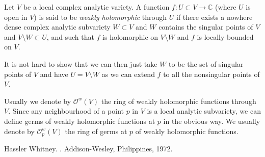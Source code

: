 \documentclass[12pt]{article}
\theoremstyle{theorem}
\theoremstyle{definition}
\theoremstyle{remark}
\begin{document}
Let $V$ be a local complex analytic variety.
A function $f \colon U \subset V \to \mathbb{C}$ (where $U$ is open in $V$)
is said to be {\em weakly holomorphic} through $U$
if there exists a nowhere dense complex analytic subvariety $W \subset V$
and $W$ contains the singular points of $V$ and $V \setminus W \subset U$,
and such that $f$ is holomorphic on $V \setminus W$ and
$f$ is locally bounded on $V$.

It is not hard to show that we can then just take $W$ to be the set of singular
points of $V$ and have $U = V \setminus W$ as we can extend $f$ to all the
nonsingular points of $V$.

Usually we denote by ${\mathcal{O}}^w(V)$ the ring of weakly holomorphic functions
through $V$.  Since any neighbourhood of a point $p$ in $V$ is a local analytic subvariety,
we can define germs of weakly holomorphic functions at $p$ in the obvious way.  We usually
denote by ${\mathcal{O}}_p^w(V)$ the ring of germs at $p$ of weakly holomorphic
functions.

\begin{thebibliography}{9}
Hassler Whitney.
{\em {}}.
Addison-Wesley, Philippines, 1972.
\end{thebibliography}
\end{document}
